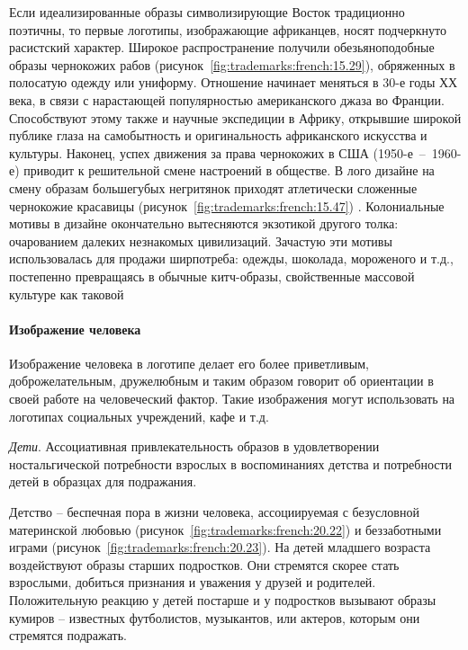     Если идеализированные образы символизирующие Восток традиционно поэтичны, то
    первые логотипы, изображающие африканцев, носят подчеркнуто расистский
    характер. Широкое распространение получили обезьяноподобные образы чернокожих
    рабов (рисунок~\ref{fig:trademarks:french:15.29}), обряженных в полосатую одежду
    или униформу.  Отношение начинает меняться в 30-е годы ХХ века, в связи с
    нарастающей популярностью американского джаза во Франции. Способствуют этому
    также и научные экспедиции в Африку, открывшие широкой публике глаза на
    самобытность и оригинальность африканского искусства и культуры.  Наконец, успех
    движения за права чернокожих в США (1950-е~--~1960-е) приводит к решительной
    смене настроений в обществе. В лого дизайне на смену образам большегубых
    негритянок приходят атлетически сложенные чернокожие красавицы
    (рисунок~\ref{fig:trademarks:french:15.47}) . Колониальные мотивы в дизайне
    окончательно вытесняются экзотикой другого толка: очарованием далеких незнакомых
    цивилизаций. Зачастую эти мотивы использовалась для продажи ширпотреба: одежды,
    шоколада, мороженого и т.д., постепенно превращаясь в обычные китч-образы,
    свойственные массовой культуре как таковой %

  \paragraph{Изображение человека}

  Изображение человека в логотипе делает его более приветливым, доброжелательным, дружелюбным и таким образом говорит об ориентации в своей работе на человеческий фактор. Такие изображения могут использовать на
    логотипах социальных учреждений, кафе и т.д.

     \emph{Дети}. Ассоциативная привлекательность образов в удовлетворении
      ностальгической потребности взрослых в воспоминаниях детства и потребности детей
      в образцах для подражания.

      Детство -- беспечная пора в жизни человека, ассоциируемая с безусловной
      материнской любовью (рисунок~\ref{fig:trademarks:french:20.22}) и беззаботными
      играми (рисунок~\ref{fig:trademarks:french:20.23}). На детей младшего возраста
      воздействуют образы старших подростков. Они стремятся скорее стать взрослыми,
      добиться признания и уважения у друзей и родителей. Положительную реакцию у
      детей постарше и у подростков вызывают образы кумиров -- известных футболистов,
      музыкантов, или актеров, которым они стремятся подражать.

